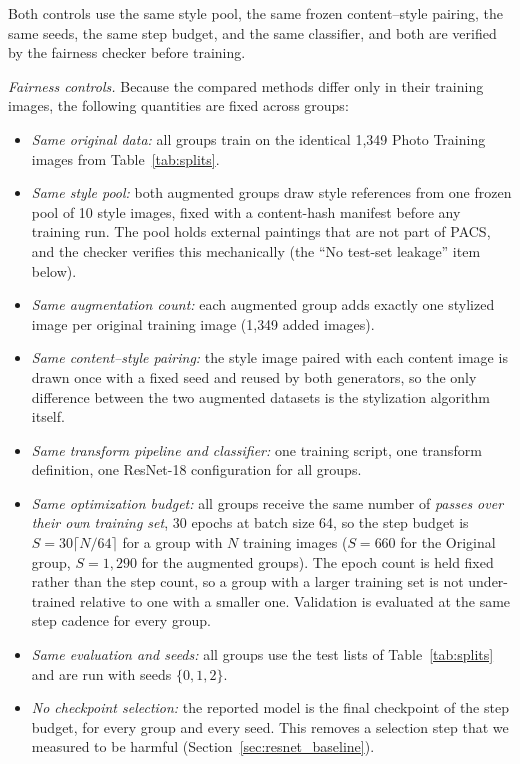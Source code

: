 Both controls use the same style pool, the same frozen content--style pairing, the same seeds, the same step budget, and the same classifier, and both are verified by the fairness checker before training.

\textit{Fairness controls.} Because the compared methods differ only in their training images, the following quantities are fixed across groups:

\begin{itemize}
\item \textit{Same original data:} all groups train on the identical 1{,}349 Photo Training images from Table~\ref{tab:splits}.
\item \textit{Same style pool:} both augmented groups draw style references from one frozen pool of 10 style images, fixed with a content-hash manifest before any training run. The pool holds external paintings that are not part of PACS, and the checker verifies this mechanically (the ``No test-set leakage'' item below).
\item \textit{Same augmentation count:} each augmented group adds exactly one stylized image per original training image (1{,}349 added images).
\item \textit{Same content--style pairing:} the style image paired with each content image is drawn once with a fixed seed and reused by both generators, so the only difference between the two augmented datasets is the stylization algorithm itself.
\item \textit{Same transform pipeline and classifier:} one training script, one transform definition, one ResNet-18 configuration for all groups.
\item \textit{Same optimization budget:} all groups receive the same number of \emph{passes over their own training set}, 30 epochs at batch size 64, so the step budget is $S = 30\lceil N/64\rceil$ for a group with $N$ training images ($S = 660$ for the Original group, $S = 1{,}290$ for the augmented groups). The epoch count is held fixed rather than the step count, so a group with a larger training set is not under-trained relative to one with a smaller one. Validation is evaluated at the same step cadence for every group.
\item \textit{Same evaluation and seeds:} all groups use the test lists of Table~\ref{tab:splits} and are run with seeds $\{0, 1, 2\}$.
\item \textit{No checkpoint selection:} the reported model is the final checkpoint of the step budget, for every group and every seed. This removes a selection step that we measured to be harmful (Section~\ref{sec:resnet_baseline}).

\end{itemize}
